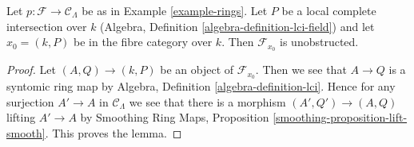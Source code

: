 \begin{lemma}
\label{lemma-lci-unobstructed}
Let $p : \mathcal{F} \to \mathcal{C}_\Lambda$ be as in
Example \ref{example-rings}. Let $P$ be a local complete
intersection over $k$ (Algebra, Definition \ref{algebra-definition-lci-field})
and let $x_0 = (k, P)$ be in the fibre category over $k$.
Then $\mathcal{F}_{x_0}$ is unobstructed.
\end{lemma}

\begin{proof}
Let $(A, Q) \to (k, P)$ be an object of $\mathcal{F}_{x_0}$.
Then we see that $A \to Q$ is a syntomic ring map by
Algebra, Definition \ref{algebra-definition-lci}.
Hence for any surjection $A' \to A$ in $\mathcal{C}_\Lambda$
we see that there is a morphism $(A', Q') \to (A, Q)$
lifting $A' \to A$ by
Smoothing Ring Maps, Proposition \ref{smoothing-proposition-lift-smooth}.
This proves the lemma.
\end{proof}













